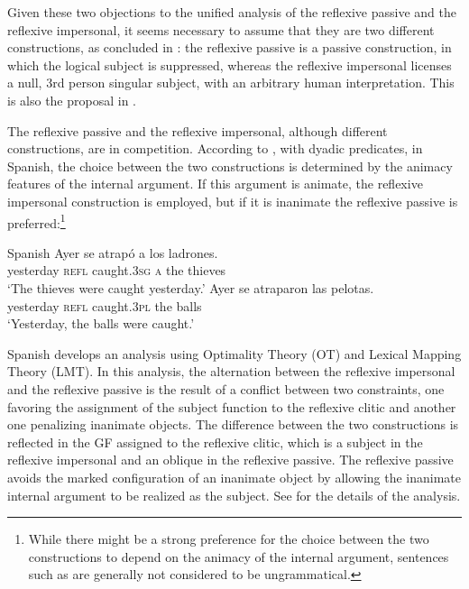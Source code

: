 \documentclass[output=paper,hidelinks]{langscibook}
\begin{document}
Given these two objections to the unified analysis of the reflexive passive and the reflexive impersonal, it seems necessary to assume that they are two different constructions, as concluded in \citet{Yang2019}: the reflexive passive is a passive construction, in which the logical subject is suppressed, whereas the reflexive impersonal licenses a null, 3rd person singular subject, with an arbitrary human interpretation. This is also the proposal in \citet{Kelling2006}.

The reflexive passive and the reflexive impersonal, although different constructions, are in competition. According to \citet{Aranovich2009}, with dyadic predicates, in Spanish, the choice between the two constructions is determined by the animacy features of the internal argument. If this argument is animate, the reflexive impersonal construction is employed, but if it is inanimate the reflexive passive is preferred:\footnote{While there might be a strong preference for the choice between the two constructions to depend on the animacy of the internal argument, sentences such as  are generally not considered to be ungrammatical.}

\ea\label{ex:Romance:49} Spanish  \citep[623--624]{Aranovich2009}
\ea\label{ex:Romance:49a}
\gll Ayer se atrapó a los ladrones.\\
       yesterday \textsc{refl} caught.\textsc{3sg} \textsc{a} the thieves\\
\glt   `The thieves were caught yesterday.'
\ex\label{ex:Romance:49b}
\gll
 Ayer se atraparon las pelotas.\\
       yesterday \textsc{refl} caught.\textsc{3pl} the balls\\
\glt   `Yesterday, the balls were caught.'\z\z

\ea\label{ex:Romance:50} Spanish \citep[623--624]{Aranovich2009}
       \z\z
\citet{Aranovich2009} develops an analysis using Optimality Theory (OT) and Lexical Mapping Theory (LMT). In this analysis, the alternation between the reflexive impersonal and the reflexive passive is the result of a conflict between two constraints, one favoring the assignment of the subject function to the reflexive clitic and another one penalizing inanimate objects. The difference between the two constructions is reflected in the GF assigned to the reflexive clitic, which is a subject in the reflexive impersonal and an oblique in the reflexive passive. The reflexive passive avoids the marked configuration of an inanimate object by allowing the inanimate internal argument to be realized as the subject. See \citet{Aranovich2009} for the details of the analysis.
\end{document}
